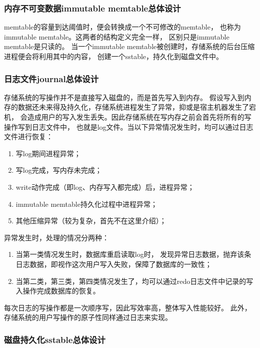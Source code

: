 		\subsubsection{内存不可变数据immutable memtable总体设计}

		memtable的容量到达阈值时，便会转换成一个不可修改的memtable，
		也称为immutable memtable。这两者的结构定义完全一样，
		区别只是immutable memtable是只读的。
		当一个immutable memtable被创建时，存储系统的后台压缩进程便会将利用其中的内容，
		创建一个sstable，持久化到磁盘文件中。

		\subsubsection{日志文件journal总体设计}

		存储系统的写操作并不是直接写入磁盘的，而是首先写入到内存。
		假设写入到内存的数据还未来得及持久化，存储系统进程发生了异常，抑或是宿主机器发生了宕机，
		会造成用户的写入发生丢失。因此存储系统在写内存之前会首先将所有的写操作写到日志文件中，
		也就是log文件。当以下异常情况发生时，均可以通过日志文件进行恢复：

		\begin{enumerate}
			\item 写log期间进程异常；
			\item 写log完成，写内存未完成；
			\item write动作完成（即log、内存写入都完成）后，进程异常；
			\item immutable memtable持久化过程中进程异常；
			\item 其他压缩异常（较为复杂，首先不在这里介绍）；
		\end{enumerate}
	
	异常发生时，处理的情况分两种：
		\begin{enumerate}
			\item 当第一类情况发生时，数据库重启读取log时，
			发现异常日志数据，抛弃该条日志数据，即视作这次用户写入失败，保障了数据库的一致性；
			\item 当第二类，第三类，第四类情况发生了，均可以通过redo日志文件中记录的写入操作完成数据库的恢复。
		\end{enumerate}
		每次日志的写操作都是一次顺序写，因此写效率高，整体写入性能较好。
		此外，存储系统的用户写操作的原子性同样通过日志来实现。

		\subsubsection{磁盘持久化sstable总体设计}

